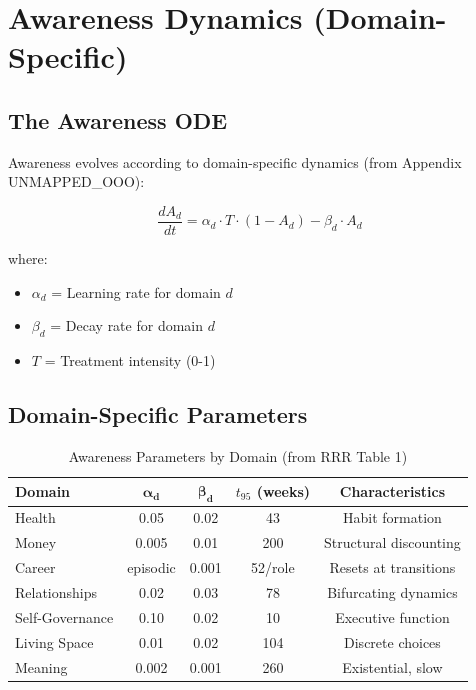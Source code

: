 \section{Awareness Dynamics (Domain-Specific)}
\label{sec:calc-awareness}

\subsection{The Awareness ODE}

Awareness evolves according to domain-specific dynamics (from Appendix UNMAPPED_OOO):

\begin{equation}
\boxed{
\frac{dA_d}{dt} = \alpha_d \cdot T \cdot (1 - A_d) - \beta_d \cdot A_d
}
\label{eq:awareness-ode}
\end{equation}

where:
\begin{itemize}
\item $\alpha_d$ = Learning rate for domain $d$
\item $\beta_d$ = Decay rate for domain $d$
\item $T$ = Treatment intensity (0-1)
\end{itemize}

\subsection{Domain-Specific Parameters}

\begin{table}[htbp]
\centering
\caption{Awareness Parameters by Domain (from RRR Table 1)}
\label{tab:awareness-params}
\renewcommand{\arraystretch}{1.3}
\begin{tabular}{@{}lcccc@{}}
\toprule
\textbf{Domain} & $\boldsymbol{\alpha_d}$ & $\boldsymbol{\beta_d}$ & \textbf{$t_{95}$ (weeks)} & \textbf{Characteristics} \\
\midrule
Health & 0.05 & 0.02 & 43 & Habit formation \\
Money & 0.005 & 0.01 & 200 & Structural discounting \\
Career & episodic & 0.001 & 52/role & Resets at transitions \\
Relationships & 0.02 & 0.03 & 78 & Bifurcating dynamics \\
Self-Governance & 0.10 & 0.02 & 10 & Executive function \\
Living Space & 0.01 & 0.02 & 104 & Discrete choices \\
Meaning & 0.002 & 0.001 & 260 & Existential, slow \\
\bottomrule
\end{tabular}
\end{table}


